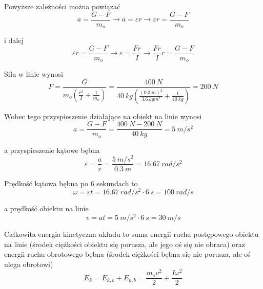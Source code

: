     Powyższe zależności można powiązać
    \begin{equation}
        a = \frac{G-F}{m_o} \xrightarrow{} a = \varepsilon r \xrightarrow{} \varepsilon r = \frac{G-F}{m_o}
    \end{equation}{}
    
    i dalej
    \begin{equation}
        \varepsilon r = \frac{G-F}{m_o} \xrightarrow{} \varepsilon = \frac{Fr}{I} \xrightarrow{} \frac{Fr}{I}r = \frac{G-F}{m_o}
    \end{equation}{}
    
    Siła w linie wynosi
    \begin{equation}
        F = \frac{G}{m_o \left( \frac{r^2}{I} + \frac{1}{m_o} \right)} = \frac{\SI{400}{N}}{\SI{40}{kg} \left( \frac{(\SI{0.3}{m})^2}{\SI{3.6}{kg m^2}} + \frac{1}{\SI{40}{kg}} \right) } = \SI{200}{N}
    \end{equation}{}
    
    Wobec tego przyspieszenie działające na obiekt na linie wynosi
    \begin{equation}
        a = \frac{G-F}{m_o} = \frac{\SI{400}{N} - \SI{200}{N}}{\SI{40}{kg}} = \SI{5}{m/s^2}
    \end{equation}{}
    
    a przyspieszenie kątowe bębna
    \begin{equation}
        \varepsilon = \frac{a}{r} = \frac{\SI{5}{m/s^2}}{\SI{0.3}{m}} = \SI{16.67}{rad/s^2}
    \end{equation}{}
    
    Prędkość kątowa bębna po 6 sekundach to
    \begin{equation}
        \omega = \varepsilon t = \SI{16.67}{rad/s^2} \cdot \SI{6}{s} = \SI{100}{rad/s}
    \end{equation}{}
    
    a prędkość obiektu na linie
    \begin{equation}
        v = at = \SI{5}{m/s^2} \cdot \SI{6}{s} = \SI{30}{m/s}
    \end{equation}{}
    
    Całkowita energia kinetyczna układu to suma energii ruchu postępowego obiektu na linie (środek ciężkości obiektu się porusza, ale jego oś się nie obraca) oraz energii ruchu obrotowego bębna (środek ciężkości bębna się nie porusza, ale oś ulega obrotowi)
    \begin{equation}
        E_k = E_{k,o} + E_{k,b} = \frac{m_o v^2}{2} + \frac{I \omega^2}{2}
    \end{equation}{}
    
